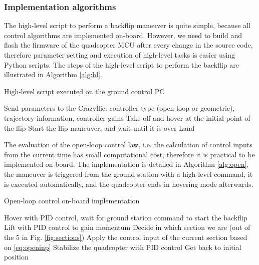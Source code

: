\subsubsection{Implementation algorithms}

The high-level script to perform a backflip maneuver is quite simple, because all control algorithms are implemented on-board. However, we need to build and flash the firmware of the quadcopter MCU after every change in the source code, therefore parameter setting and execution of high-level tasks is easier using Python scripts. The steps of the high-level script to perform the backflip are illustrated in Algorithm \ref{alg:hl}.

\begin{algorithm}
  \caption{High-level script executed on the ground control PC}
  \label{alg:hl}
  \begin{algorithmic}[1]
    \State Send parameters to the Crazyflie: controller type (open-loop or geometric), trajectory information, controller gains
    \State Take off and hover at the initial point of the flip
    \State Start the flip maneuver, and wait until it is over
    \State Land
  \end{algorithmic}
  \end{algorithm}

The evaluation of the open-loop control law, i.e. the calculation of control inputs from the current time has small computational cost, therefore it is practical to be implemented on-board. The implementation is detailed in Algorithm \ref{alg:open}, the maneuver is triggered from the ground station with a high-level command, it is executed automatically, and the quadcopter ends in hovering mode afterwards.
\begin{algorithm}
  \caption{Open-loop control on-board implementation}
  \label{alg:open}
  \begin{algorithmic}[1]
    \State Hover with PID control, wait for ground station command to start the backflip
    \State Lift with PID control to gain momentum
      \State Decide in which section we are (out of the 5 in Fig. \ref{fig:sections})
      \State Apply the control input of the current section based on \eqref{eq:openinp}
    \EndWhile
    \State Stabilize the quadcopter with PID control
    \State Get back to initial position
  \end{algorithmic}
  \end{algorithm}

